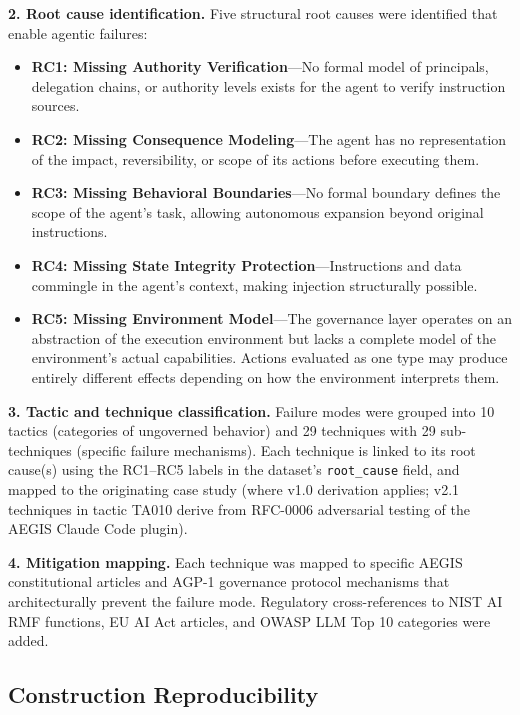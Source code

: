 \documentclass{IEEEoj-data}
\newcommand{\replaced}[2]{#1}
\newcommand{\added}[1]{#1}
\newcommand{\deleted}[1]{}
\begin{document}
{\bf 2. Root cause identification.} \replaced{Five}{Four} structural root causes were identified that enable agentic failures:
\begin{itemize}
\item {\bf RC1: Missing Authority Verification}---No formal model of principals, delegation chains, or authority levels exists for the agent to verify instruction sources.
\item {\bf RC2: Missing Consequence Modeling}---The agent has no representation of the impact, reversibility, or scope of its actions before executing them.
\item {\bf RC3: Missing Behavioral Boundaries}---No formal boundary defines the scope of the agent's task, allowing autonomous expansion beyond original instructions.
\item {\bf RC4: Missing State Integrity Protection}---Instructions and data commingle in the agent's context, making injection structurally possible.
\item \added{{\bf RC5: Missing Environment Model}---The governance layer operates on an abstraction of the execution environment but lacks a complete model of the environment's actual capabilities. Actions evaluated as one type may produce entirely different effects depending on how the environment interprets them.}
\end{itemize}

{\bf 3. Tactic and technique classification.} Failure modes were grouped into \replaced{10 tactics}{9 tactics} (categories of ungoverned behavior) and \replaced{29 techniques with 29 sub-techniques}{20 techniques} (specific failure mechanisms). \deleted{Each technique was assigned a severity rating (critical, high, medium, or low), linked} \added{Each technique is linked} to its root cause(s) using the \replaced{RC1--RC5}{RC1--RC4} labels in the dataset's \texttt{root\_cause} field, and mapped to the originating case study\added{ (where v1.0 derivation applies; v2.1 techniques in tactic TA010 derive from RFC-0006 adversarial testing of the AEGIS Claude Code plugin)}.

{\bf 4. Mitigation mapping.} Each technique was mapped to specific AEGIS constitutional articles and AGP-1 governance protocol mechanisms that architecturally prevent the failure mode. Regulatory cross-references to NIST AI RMF functions, EU AI Act articles, and OWASP LLM Top 10 categories were added.

\subsection*{\added{Construction Reproducibility}}
\end{document}
